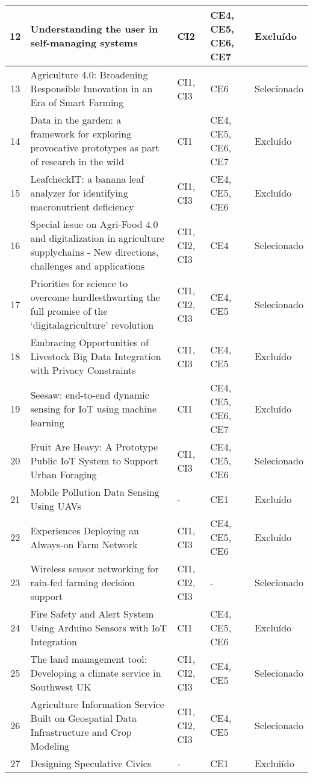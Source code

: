\documentclass[12pt]{article}
\begin{document}
\begin{footnotesize}
\begin{longtable}{|c|p{7cm}|p{2cm}|p{2cm}|p{1.6cm}|}
		12 & Understanding the user in self-managing systems & CI2 & CE4, CE5, CE6, CE7 & Excluído \\ \hline
		13 & Agriculture 4.0: Broadening Responsible Innovation in an Era of Smart Farming & CI1, CI3 & CE6 & Selecionado \\ \hline
		14 & Data in the garden: a framework for exploring provocative prototypes as part of research in the wild & CI1 & CE4, CE5, CE6, CE7 & Excluído \\ \hline
		15 & LeafcheckIT: a banana leaf analyzer for identifying macronutrient deficiency & CI1, CI3 & CE4, CE5, CE6 & Excluído \\ \hline
		16 & Special issue on Agri-Food 4.0 and digitalization in agriculture supplychains - New directions, challenges and applications & CI1, CI2, CI3 & CE4 & Selecionado \\ \hline
		17 & Priorities for science to overcome hurdlesthwarting the full promise of the ‘digitalagriculture’ revolution & CI1, CI2, CI3 & CE4, CE5 & Selecionado \\ \hline
		18 & Embracing Opportunities of Livestock Big Data Integration with Privacy Constraints & CI1, CI3 & CE4, CE5 & Excluído \\ \hline
		19 & Seesaw: end-to-end dynamic sensing for IoT using machine learning & CI1 & CE4, CE5, CE6, CE7 & Excluído \\ \hline
		20 & Fruit Are Heavy: A Prototype Public IoT System to Support Urban Foraging & CI1, CI3 & CE4, CE5, CE6 & Selecionado \\ \hline
		21 & Mobile Pollution Data Sensing Using UAVs & - & CE1 & Excluído \\ \hline
		22 & Experiences Deploying an Always-on Farm Network & CI1, CI3 & CE4, CE5, CE6 & Excluído \\ \hline
		23 & Wireless sensor networking for rain-fed farming decision support & CI1, CI2, CI3 & - & Selecionado \\ \hline
		24 & Fire Safety and Alert System Using Arduino Sensors with IoT Integration & CI1 & CE4, CE5, CE6 & Excluído \\ \hline
		25 & The land management tool: Developing a climate service in Southwest UK & CI1, CI2, CI3 & CE4, CE5 & Selecionado \\ \hline
		26 & Agriculture Information Service Built on Geospatial Data Infrastructure and Crop Modeling & CI1, CI2, CI3 & CE4, CE5 & Selecionado \\ \hline
		27 & Designing Speculative Civics & - & CE1 & Excluiído \\ \hline

\end{longtable}
\end{footnotesize}
\end{document}
